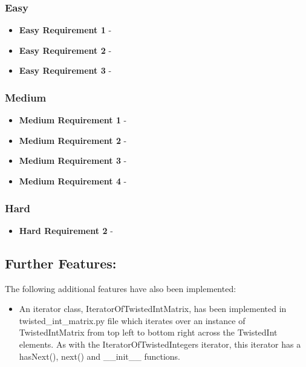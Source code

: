 \documentclass[11]{article}
\begin{document}
	 	\subsubsection{Easy}
			\begin{itemize}
				\item \textbf{Easy Requirement 1} - 
				\item \textbf{Easy Requirement 2} - 
				\item \textbf{Easy Requirement 3} - 
			\end{itemize}

		\subsubsection{Medium}
			\begin{itemize}
				\item \textbf{Medium Requirement 1} - 
				\item \textbf{Medium Requirement 2} - 
				\item \textbf{Medium Requirement 3} - 
				\item \textbf{Medium Requirement 4} -
			\end{itemize}
		\subsubsection{Hard}
				\begin{itemize}
					\item \textbf{Hard Requirement 2} - 
				\end{itemize}
	\subsection{Further Features:}
		The following additional features have also been implemented:
		\begin{itemize}
			\item An iterator class, IteratorOfTwistedIntMatrix, has been implemented in twisted\_int\_matrix.py file which iterates over an instance of TwistedIntMatrix from top left to bottom right across the TwistedInt elements. As with the IteratorOfTwistedIntegers iterator, this iterator has a hasNext(), next() and \_\_init\_\_ functions.
		\end{itemize}
\end{document}
